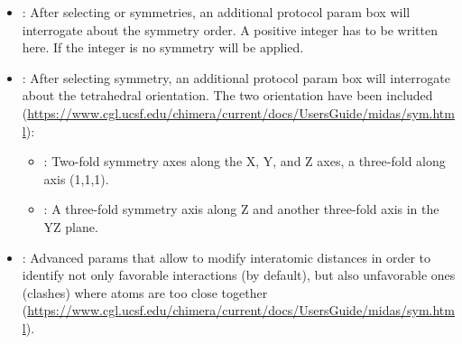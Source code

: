 \begin{itemize}
\begin{itemize}
            \begin{itemize}
            \item {}: \chimera orientation ; two-fold symmetry axes along the X, Y, and Z axes.
            \item {}: \chimera orientation ; \chimera orientation  rotated 90\degree about Z. 
            \item {}: \chimera orientation ; two-fold symmetry along Y and 5-fold along Z. 
            \item {}: \chimera orientation ; \chimera orientation  rotated 180\degree about X.
            \item {}: \chimera orientation ; two-fold symmetry along X and 3-fold along Z. 
            \item {}: \chimera orientation ; \chimera orientation  rotated 180\degree about Y.
            \item {}: \chimera orientation ; two-fold symmetry along X and 5-fold along Z.
            \item {}: \chimera orientation ; \chimera orientation  rotated 180\degree about Y.
            \end{itemize}
    \item {}: After selecting  or  symmetries, an additional protocol param box will interrogate about the symmetry order. A positive integer has to be written here. If the integer is  no symmetry will be applied. 
    \item {}: After selecting  symmetry, an additional protocol param box will interrogate about the tetrahedral orientation. The two \chimera orientation have been included (\url{https://www.cgl.ucsf.edu/chimera/current/docs/UsersGuide/midas/sym.html}):
            \begin{itemize}
            \item {}: Two-fold symmetry axes along the X, Y, and Z axes, a three-fold along axis (1,1,1).
            \item {}: A three-fold symmetry axis along Z and another three-fold axis in the YZ plane.
            \end{itemize}
    \item {}: Advanced params that allow to modify interatomic distances in order to identify not only favorable interactions (by default), but also unfavorable ones (clashes) where atoms are too close together (\url{https://www.cgl.ucsf.edu/chimera/current/docs/UsersGuide/midas/sym.html}).

\end{itemize}
\end{itemize}
